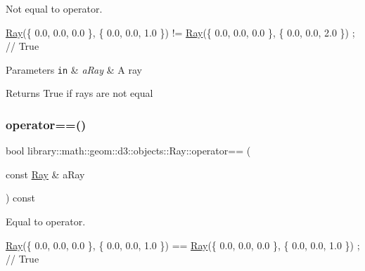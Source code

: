 Not equal to operator. 


\begin{DoxyCode}
\hyperlink{classlibrary_1_1math_1_1geom_1_1d3_1_1objects_1_1_ray_a11b7613464daaebc6e25a758b057f203}{Ray}(\{ 0.0, 0.0, 0.0 \}, \{ 0.0, 0.0, 1.0 \}) != \hyperlink{classlibrary_1_1math_1_1geom_1_1d3_1_1objects_1_1_ray_a11b7613464daaebc6e25a758b057f203}{Ray}(\{ 0.0, 0.0, 0.0 \}, \{ 0.0, 0.0, 2.0 \}) ; \textcolor{comment}{// True}
\end{DoxyCode}



\begin{DoxyParams}[1]{Parameters}
\mbox{\tt in}  & {\em a\+Ray} & A ray \\
\hline
\end{DoxyParams}
\begin{DoxyReturn}{Returns}
True if rays are not equal 
\end{DoxyReturn}
\mbox{\label{classlibrary_1_1math_1_1geom_1_1d3_1_1objects_1_1_ray_a90dbc4baa23e5f74b26b566bb862592f}} 
\subsubsection{\texorpdfstring{operator==()}{operator==()}}
{\footnotesize\ttfamily bool library\+::math\+::geom\+::d3\+::objects\+::\+Ray\+::operator== (\begin{DoxyParamCaption}\item[{const \hyperlink{classlibrary_1_1math_1_1geom_1_1d3_1_1objects_1_1_ray}{Ray} \&}]{a\+Ray }\end{DoxyParamCaption}) const}



Equal to operator. 


\begin{DoxyCode}
\hyperlink{classlibrary_1_1math_1_1geom_1_1d3_1_1objects_1_1_ray_a11b7613464daaebc6e25a758b057f203}{Ray}(\{ 0.0, 0.0, 0.0 \}, \{ 0.0, 0.0, 1.0 \}) == \hyperlink{classlibrary_1_1math_1_1geom_1_1d3_1_1objects_1_1_ray_a11b7613464daaebc6e25a758b057f203}{Ray}(\{ 0.0, 0.0, 0.0 \}, \{ 0.0, 0.0, 1.0 \}) ; \textcolor{comment}{// True}
\end{DoxyCode}



